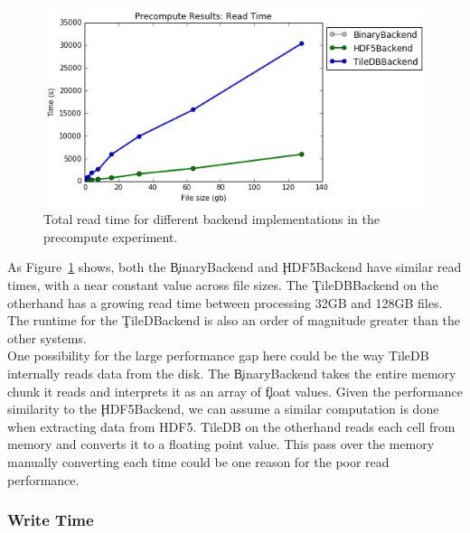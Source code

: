 \begin{figure}[h]
\begin{center}
\includegraphics[scale=0.75]{./img/precompute-exp-read-time.png}
\caption{Total read time for different backend implementations in the
  precompute experiment.}
\label{fig:precompute-exp-read-time}
\end{center}
\end{figure}

As Figure~\ref{fig:precompute-exp-read-time} shows, both the \c{BinaryBackend}
and \c{HDF5Backend} have similar read times, with a near constant value
across file sizes. The \c{TileDBBackend} on the otherhand has a growing read
time between processing 32GB and 128GB files. The runtime for the
\c{TileDBackend} is also an order of magnitude greater than the other systems. \\

One possibility for the large performance gap here could be the way TileDB
internally reads data from the disk. The \c{BinaryBackend} takes the entire
memory chunk it reads and interprets it as an array of \c{float} values. Given
the performance similarity to the \c{HDF5Backend}, we can assume a similar
computation is done when extracting data from HDF5. TileDB on the otherhand
reads each cell from memory and converts it to a floating point value. This
pass over the memory manually converting each time could be one reason for the
poor read performance.

\subsubsection{Write Time}

